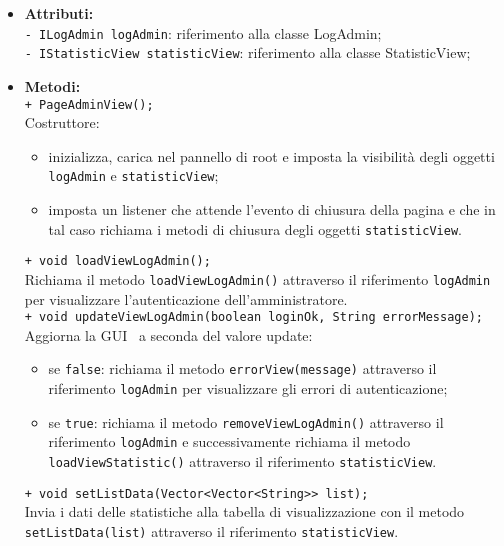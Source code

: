 {\begin{sloppypar}
{\begin{itemize}
\begin{itemize}
				\item[] \textbf{Attributi:}\\
					\texttt{- ILogAdmin logAdmin}: riferimento alla classe LogAdmin;\\
					\texttt{- IStatisticView statisticView}: riferimento alla classe StatisticView;\\

				\item[] \textbf{Metodi:}\\
					\texttt{+ PageAdminView();}\\
					Costruttore:
					\begin{itemize}
						\item inizializza, carica nel pannello di root e imposta la visibilità degli oggetti \texttt{logAdmin} e \texttt{statisticView};
						\item imposta un listener che attende l’evento di chiusura della pagina e che in tal caso richiama i metodi di chiusura degli oggetti \texttt{statisticView}.\\
					\end{itemize}
					
					\texttt{+ void loadViewLogAdmin();}\\
					Richiama il metodo \texttt{loadViewLogAdmin()} attraverso il riferimento \texttt{logAdmin} per visualizzare l’autenticazione dell’amministratore.\\
					
					\texttt{+ void updateViewLogAdmin(boolean loginOk, String errorMessage);}\\
					Aggiorna la GUI\g~ a seconda del valore update:
					\begin{itemize}
						\item se \texttt{false}: richiama il metodo \texttt{errorView(message)} attraverso il riferimento \texttt{logAdmin} per visualizzare gli errori di autenticazione;
						\item se \texttt{true}: richiama il metodo \texttt{removeViewLogAdmin()} attraverso il riferimento \texttt{logAdmin} e successivamente richiama il metodo \texttt{loadViewStatistic()} attraverso il riferimento \texttt{statisticView}.\\
					\end{itemize}
					
					\texttt{+ void setListData(Vector<Vector<String>> list);}\\
					Invia i dati delle statistiche alla tabella di visualizzazione con il metodo \texttt{setListData(list)} attraverso il riferimento \texttt{statisticView}.\\
					

\end{itemize}
\end{itemize}}
\end{sloppypar}}
